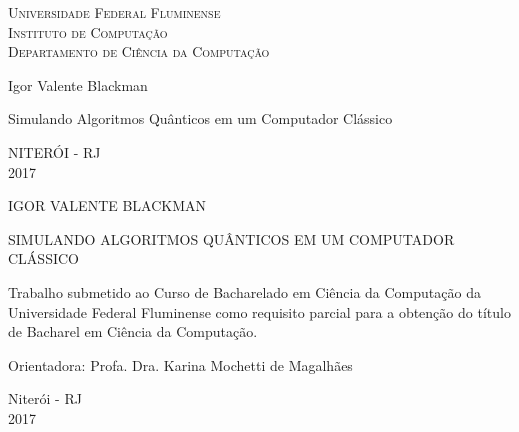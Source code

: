 \documentclass[a4paper, 12pt, oneside]{book}
\def\titulo{Simulando Algoritmos Quânticos em um
Computador Clássico}
\def\nome{Igor Valente Blackman}
\def\ano{2017}
\begin{document}

\begin{titlepage}
  \begin{center}
    \Large{\textsc{Universidade Federal Fluminense} \\
           \textsc{Instituto de Computação} \\ 
           \textsc{Departamento de Ciência da Computação} 
          }
    \par\vfill
    \LARGE{\nome}
    \par\vfill
    \LARGE{\titulo}
    \par\vfill
    \Large{NITERÓI - RJ \\
    \ano}
  \end{center}
\end{titlepage}

\setcounter{page}{2}

\begin{center}

\MakeUppercase{\nome}

\vfill

\MakeUppercase{\titulo}

\vspace{3.0cm}

\begin{flushright}
\begin{minipage}{0.50\textwidth}

Trabalho submetido ao Curso de Bacharelado em Ciência da Computação da Universidade Federal Fluminense como requisito parcial para a obtenção do título de Bacharel em Ciência da Computação.

\end{minipage}
\end{flushright}

\vspace{3.0cm}

Orientadora: Profa. Dra. Karina Mochetti de Magalhães

\vfill

Niterói - RJ \\
\ano

\end{center}

\newpage

\end{document}
